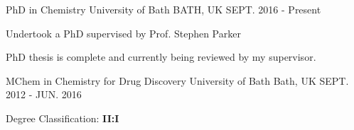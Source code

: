 \begin{cventries}
  \cventry
    {PhD in Chemistry}
    {University of Bath}
    {BATH, UK}
    {SEPT. 2016 - Present}
    {
      \begin{cvitems}
        \item {Undertook a PhD supervised by Prof. Stephen Parker}
        \item {PhD thesis is complete and currently being reviewed by my supervisor.}
      \end{cvitems}
    }
  \cventry
    {MChem in Chemistry for Drug Discovery}
    {University of Bath}
    {Bath, UK}
    {SEPT. 2012 - JUN. 2016}
    {
      \begin{cvitems}
        \item {Degree Classification: \textbf{II:I}}
      \end{cvitems}
    }
\end{cventries}
